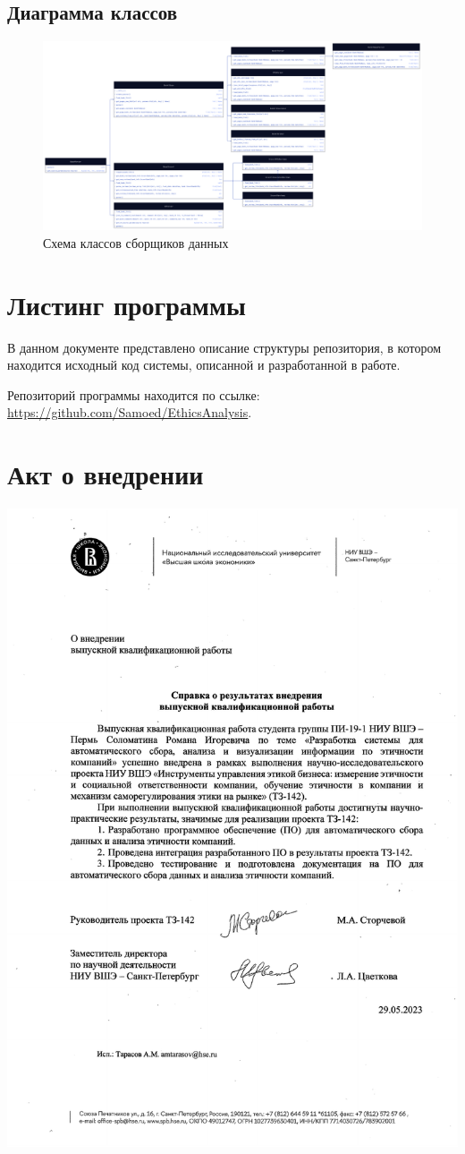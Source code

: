 \documentclass[PI, VKR]{HSEUniversity}
\begin{document}
\begin{landscape}
\chapter{Диаграмма классов}
\label{sec:orge49e4c8}
\begin{figure}[h!]
\centering
\includegraphics[width=.9\linewidth]{img/d2/parser_class.png}
\caption{\label{fig:parser_class_diagram}Схема классов сборщиков данных}
\end{figure}
\end{landscape}
\chapter{Листинг программы}
\label{sec:org5951735}
В данном документе представлено описание структуры репозитория, в котором находится исходный код системы, описанной и разработанной в работе.

Репозиторий программы находится по ссылке: \url{https://github.com/Samoed/EthicsAnalysis}.
\chapter{Акт о внедрении}
\label{sec:orge719756}
\hspace*{-2cm}\includegraphics[scale=0.85]{img/deployment_act.pdf}
\end{document}
